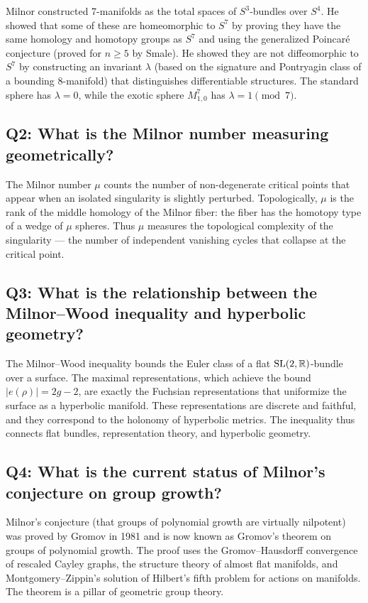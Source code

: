 Milnor constructed 7-manifolds as the total spaces of \(S^3\)-bundles over \(S^4\). He showed that some of these are homeomorphic to \(S^7\) by proving they have the same homology and homotopy groups as \(S^7\) and using the generalized Poincar\'e conjecture (proved for \(n \geq 5\) by Smale). He showed they are not diffeomorphic to \(S^7\) by constructing an invariant \(\lambda\) (based on the signature and Pontryagin class of a bounding 8-manifold) that distinguishes differentiable structures. The standard sphere has \(\lambda = 0\), while the exotic sphere \(M^7_{1,0}\) has \(\lambda = 1 \pmod{7}\).

\subsection*{Q2: What is the Milnor number measuring geometrically?}

The Milnor number \(\mu\) counts the number of non-degenerate critical points that appear when an isolated singularity is slightly perturbed. Topologically, \(\mu\) is the rank of the middle homology of the Milnor fiber: the fiber has the homotopy type of a wedge of \(\mu\) spheres. Thus \(\mu\) measures the topological complexity of the singularity --- the number of independent vanishing cycles that collapse at the critical point.

\subsection*{Q3: What is the relationship between the Milnor--Wood inequality and hyperbolic geometry?}

The Milnor--Wood inequality bounds the Euler class of a flat \(\operatorname{SL}(2,\mathbb{R})\)-bundle over a surface. The maximal representations, which achieve the bound \(|e(\rho)| = 2g-2\), are exactly the Fuchsian representations that uniformize the surface as a hyperbolic manifold. These representations are discrete and faithful, and they correspond to the holonomy of hyperbolic metrics. The inequality thus connects flat bundles, representation theory, and hyperbolic geometry.

\subsection*{Q4: What is the current status of Milnor's conjecture on group growth?}

Milnor's conjecture (that groups of polynomial growth are virtually nilpotent) was proved by Gromov in 1981 and is now known as Gromov's theorem on groups of polynomial growth. The proof uses the Gromov--Hausdorff convergence of rescaled Cayley graphs, the structure theory of almost flat manifolds, and Montgomery--Zippin's solution of Hilbert's fifth problem for actions on manifolds. The theorem is a pillar of geometric group theory.

